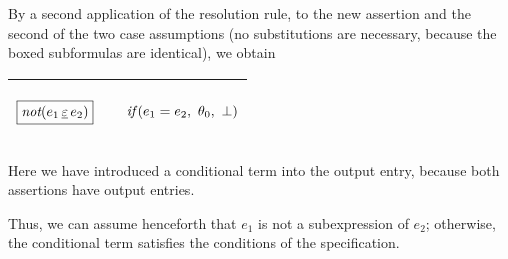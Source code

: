 \documentclass[runningheads]{llncs}
\DeclareMathOperator{\unot}{\emph{not}\kern-.0pt}
\begin{document}
By a second application of the resolution rule, to the new assertion and the second of the two case assumptions (no substitutions are necessary, because the boxed subformulas are identical), we obtain 

\begin{center}
\begin{tabular}{|m{}|m{}||m{}|}
 \hline 
\begin{center}
$\boxed{\unot(\e{1} \occurseq \e{2})}$
\end{center}
  & 
& 
\begin{center}
$
\emph{if}\,( {e_1 = e_2},\allowbreak \ {\theta_{0}},\allowbreak \ {\bot})
$ 
 \end{center}
\\
\hline
\end{tabular}
\end{center}
Here we have introduced a conditional term into the output entry, because both assertions have output entries.  

Thus, we can assume henceforth that $e_1$ is not a subexpression of $e_2$;  otherwise, the conditional term satisfies the conditions of the specification.
\end{document}
